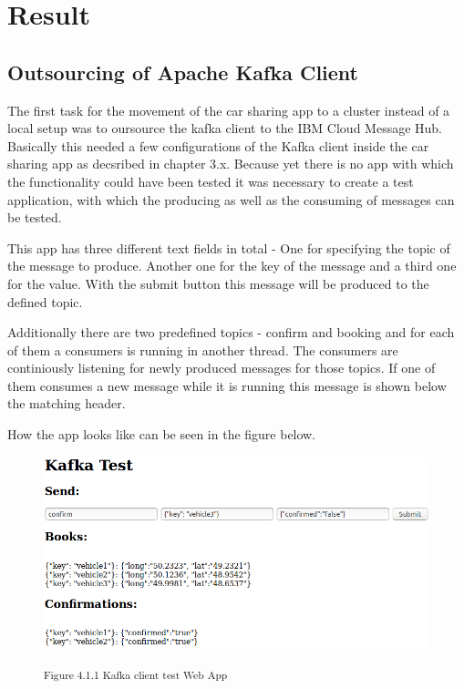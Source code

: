 
\chapter{Result}

\section{Outsourcing of Apache Kafka Client}

The first task for the movement of the car sharing app to a cluster instead of a local setup was to oursource the kafka client to the IBM Cloud Message Hub. Basically this needed a few configurations of the Kafka client inside the car sharing app as decsribed in chapter 3.x. Because yet there is no app with which the functionality could have been tested it was necessary to create a test application, with which the producing as well as the consuming of messages can be tested.

This app has three different text fields in total - One for specifying the topic of the message to produce. Another one for the key of the message and a third one for the value. With the submit button this message will be produced to the defined topic.

Additionally there are two predefined topics - confirm and booking and for each of them a consumers is running in another thread. The consumers are continiously listening for newly produced messages for those topics. If one of them consumes a new message while it is running this message is shown below the matching header.

How the app looks like can be seen in the figure below.

\begin{figure}[h]
\centering
\includegraphics[width=\textwidth/5*4]{images/kafka_test_ui.png}

\textsuperscript{Figure 4.1.1 Kafka client test Web App}\\
\end{figure}

